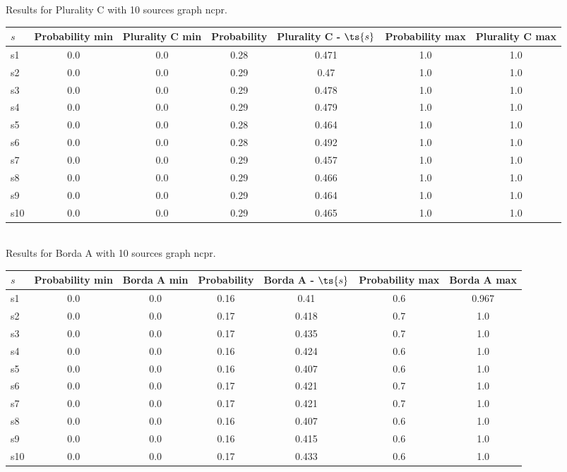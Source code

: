 \documentclass{article}
\begin{document}
\noindent Results for Plurality C with 10 sources graph ncpr.

\noindent\begin{tabular}{|l|c|c|c|c|c|c|}
\hline
$s$& Probability min & Plurality C min & Probability & Plurality C - $\ts{s}$ & Probability max & Plurality C max\\
\hline
s1 &0.0 & 0.0 & 0.28 & 0.471 & 1.0 & 1.0\\
\hline
s2 &0.0 & 0.0 & 0.29 & 0.47 & 1.0 & 1.0\\
\hline
s3 &0.0 & 0.0 & 0.29 & 0.478 & 1.0 & 1.0\\
\hline
s4 &0.0 & 0.0 & 0.29 & 0.479 & 1.0 & 1.0\\
\hline
s5 &0.0 & 0.0 & 0.28 & 0.464 & 1.0 & 1.0\\
\hline
s6 &0.0 & 0.0 & 0.28 & 0.492 & 1.0 & 1.0\\
\hline
s7 &0.0 & 0.0 & 0.29 & 0.457 & 1.0 & 1.0\\
\hline
s8 &0.0 & 0.0 & 0.29 & 0.466 & 1.0 & 1.0\\
\hline
s9 &0.0 & 0.0 & 0.29 & 0.464 & 1.0 & 1.0\\
\hline
s10 &0.0 & 0.0 & 0.29 & 0.465 & 1.0 & 1.0\\
\hline
\end{tabular}\\

\noindent Results for Borda A with 10 sources graph ncpr.

\noindent\begin{tabular}{|l|c|c|c|c|c|c|}
\hline
$s$& Probability min & Borda A min & Probability & Borda A - $\ts{s}$ & Probability max & Borda A max\\
\hline
s1 &0.0 & 0.0 & 0.16 & 0.41 & 0.6 & 0.967\\
\hline
s2 &0.0 & 0.0 & 0.17 & 0.418 & 0.7 & 1.0\\
\hline
s3 &0.0 & 0.0 & 0.17 & 0.435 & 0.7 & 1.0\\
\hline
s4 &0.0 & 0.0 & 0.16 & 0.424 & 0.6 & 1.0\\
\hline
s5 &0.0 & 0.0 & 0.16 & 0.407 & 0.6 & 1.0\\
\hline
s6 &0.0 & 0.0 & 0.17 & 0.421 & 0.7 & 1.0\\
\hline
s7 &0.0 & 0.0 & 0.17 & 0.421 & 0.7 & 1.0\\
\hline
s8 &0.0 & 0.0 & 0.16 & 0.407 & 0.6 & 1.0\\
\hline
s9 &0.0 & 0.0 & 0.16 & 0.415 & 0.6 & 1.0\\
\hline
s10 &0.0 & 0.0 & 0.17 & 0.433 & 0.6 & 1.0\\
\hline
\end{tabular}\\
\end{document}
